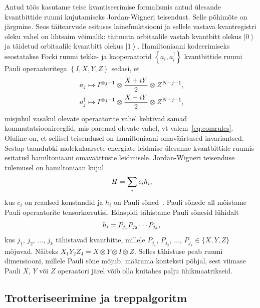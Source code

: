 \documentclass[12pt]{report}
\def\cparen#1{\left\{#1\right\}}
\def\ket#1{\left|#1\right>}
\begin{document}
Antud töös kasutame teise kvantiseerimise formalismis antud ülesande kvantbittide ruumi kujutamiseks Jordan-Wigneri teisendust.
Selle põhimõte on järgmine.
Seos täitearvude esituses lainefunktsiooni ja sellele vastava kvantregistri oleku vahel on lihtsaim võimalik: täitmata orbitaalile vastab kvantbitt olekus \(\ket{0}\) ja täidetud orbitaalile kvantbitt olekus \(\ket{1}\).
Hamiltoniaani kodeerimiseks seostatakse Focki ruumi tekke- ja kaoperaatorid \(\cparen{a_i, a_i^\dagger}\) kvantbittide ruumi Pauli operaatoritega \(\cparen{I, X, Y, Z}\) sedasi, et
\begin{align}
    a_j &\mapsto I^{\otimes j-1} \otimes \frac{X+iY}{2} \otimes Z^{N-j-1} \rlap{,} \\
    a_j^\dagger &\mapsto I^{\otimes j-1} \otimes \frac{X-iY}{2} \otimes Z^{N-j-1} \rlap{,}
\end{align}
misjuhul vasakul olevate operaatorite vahel kehtivad samad kommutatsioonireeglid, mis paremal olevate vahel, vt valem~\eqref{eq:comrules}.
Oluline on, et sellisel teisendusel on hamiltoniaani omaväärtused invariantsed.
Sestap taandubki molekulaarsete energiate leidmise ülesanne kvantbittide ruumis esitatud hamiltoniaani omaväärtuste leidmisele.
Jordan-Wigneri teisenduse tulemusel on hamiltoniaan kujul
\begin{align}\label{eq:paulisum}
    H = \sum_i c_i h_i \rlap{,}
\end{align}
kus \(c_i\) on reaalsed konstandid ja \(h_i\) on Pauli sõned~\cite{whitfield+etal2011, mcardle+etal}.
Pauli sõnede all mõistame Pauli operaatorite tensorkorrutisi.
Edaspidi tähistame Pauli sõnesid lühidalt
\begin{equation} h_i=P_{j_1}P_{j_2}\cdots P_{j_k} \rlap{,}\end{equation}
kus \(j_1\), \(j_2\), $\ldots$, \(j_k\) tähistavad kvantbitte, millele \(P_{j_1}\), \(P_{j_2}\), \(\ldots\), \(P_{j_k}\in\{X,Y,Z\}\) mõjuvad.
Näiteks \(X_1Y_2Z_4=X\otimes Y\otimes I\otimes Z.\)
Selles tähistuse peab ruumi dimensiooni, millele Pauli sõne mõjub, määrama konteksti põhjal, sest viimase Pauli \(X\), \(Y\) või \(Z\) operaatori järel võib olla kuitahes palju ühikmaatrikseid.

\subsection{Trotteriseerimine ja treppalgoritm}\label{sec:qcirc}
\end{document}
